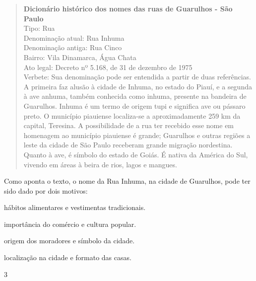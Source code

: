 \begin{quote}
\textbf{Dicionário histórico dos nomes das ruas de Guarulhos - São Paulo}\\
Tipo: Rua\\
Denominação atual: Rua Inhuma\\
Denominação antiga: Rua Cinco\\
Bairro: Vila Dinamarca, Água Chata\\
Ato legal: Decreto nº 5.168, de 31 de dezembro de 1975\\
Verbete: Sua denominação pode ser entendida a partir de duas
referências. A primeira faz alusão à cidade de Inhuma, no estado do
Piauí, e a segunda à ave anhuma, também conhecida como inhuma, presente
na bandeira de Guarulhos. Inhuma é um termo de origem tupi e significa
ave ou pássaro preto. O município piauiense localiza-se a
aproximadamente 259 km da capital, Teresina. A possibilidade de a rua
ter recebido esse nome em homenagem ao município piauiense é grande;
Guarulhos e outras regiões a leste da cidade de São Paulo receberam
grande migração nordestina. Quanto à ave, é símbolo do estado de Goiás.
É nativa da América do Sul, vivendo em áreas à beira de rios, lagos e
mangues.

\end{quote}

Como aponta o texto, o nome da Rua Inhuma, na cidade de Guarulhos, pode
ter sido dado por dois motivos:

\begin{escolha}
\item hábitos alimentares e vestimentas tradicionais.

\item importância do comércio e cultura popular.

\item origem dos moradores e símbolo da cidade.

\item localização na cidade e formato das casas.
\end{escolha}


\num{3}

